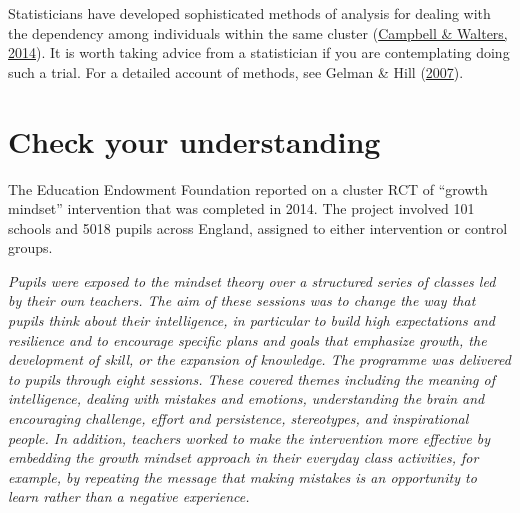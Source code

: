\documentclass{krantz}
\begin{document}
Statisticians have developed sophisticated methods of analysis for dealing with the dependency among individuals within the same cluster (\protect\hyperlink{ref-campbell2014}{Campbell \& Walters, 2014}). It is worth taking advice from a statistician if you are contemplating doing such a trial. For a detailed account of methods, see Gelman \& Hill (\protect\hyperlink{ref-gelman2007}{2007}).

\hypertarget{check-your-understanding-17}{%
\section{Check your understanding}\label{check-your-understanding-17}}

The Education Endowment Foundation reported on a cluster RCT of ``growth mindset'' intervention that was completed in 2014. The project involved 101 schools and 5018 pupils across England, assigned to either intervention or control groups.

\emph{Pupils were exposed to the mindset theory over a structured series of classes led by their own teachers. The aim of these sessions was to change the way that pupils think about their intelligence, in particular to build high expectations and resilience and to encourage specific plans and goals that emphasize growth, the development of skill, or the expansion of knowledge. The programme was delivered to pupils through eight sessions. These covered themes including the meaning of intelligence, dealing with mistakes and emotions, understanding the brain and encouraging challenge, effort and persistence, stereotypes, and inspirational people. In addition, teachers worked to make the intervention more effective by embedding the growth mindset approach in their everyday class activities, for example, by repeating the message that making mistakes is an opportunity to learn rather than a negative experience.}
\end{document}
